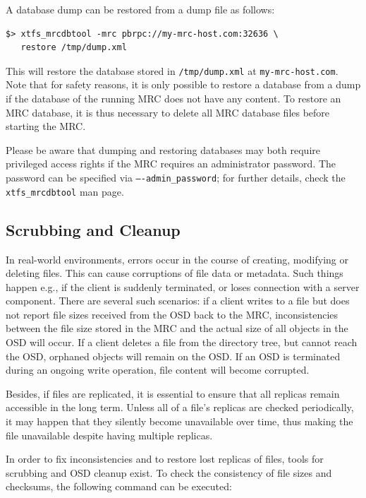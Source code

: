 \documentclass[a4paper,10pt]{book}
\begin{document}
A database dump can be restored from a dump file as follows:

\begin{verbatim}
$> xtfs_mrcdbtool -mrc pbrpc://my-mrc-host.com:32636 \
   restore /tmp/dump.xml
\end{verbatim}

This will restore the database stored in \texttt{/tmp/dump.xml} at \texttt{my-mrc-host.com}. Note that for safety reasons, it is only possible to restore a database from a dump if the database of the running MRC does not have any content. To restore an MRC database, it is thus necessary to delete all MRC database files before starting the MRC.

Please be aware that dumping and restoring databases may both require privileged access rights if the MRC requires an administrator password. The password can be specified via \texttt{----admin\_password}; for further details, check the \texttt{xtfs\_mrcdbtool} man page.

\subsection{Scrubbing and Cleanup}
\label{sec:scrubber_cleanup}

In real-world environments, errors occur in the course of creating, modifying or deleting files. This can cause corruptions of file data or metadata. Such things happen e.g., if the client is suddenly terminated, or loses connection with a server component. There are several such scenarios: if a client writes to a file but does not report file sizes received from the OSD back to the MRC, inconsistencies between the file size stored in the MRC and the actual size of all objects in the OSD will occur. If a client deletes a file from the directory tree, but cannot reach the OSD, orphaned objects will remain on the OSD. If an OSD is terminated during an ongoing write operation, file content will become corrupted.

Besides, if files are replicated, it is essential to ensure that all replicas remain accessible in the long term. Unless all of a file's replicas are checked periodically, it may happen that they silently become unavailable over time, thus making the file unavailable despite having multiple replicas.

In order to fix inconsistencies and to restore lost replicas of files, tools for scrubbing and OSD cleanup exist. To check the consistency of file sizes and checksums, the following command can be executed:
\end{document}
